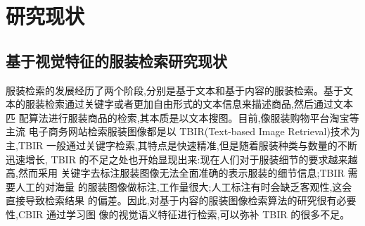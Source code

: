 \chapter{研究现状}



\section{基于视觉特征的服装检索研究现状}

服装检索的发展经历了两个阶段,分别是基于文本和基于内容的服装检索。基于文
本的服装检索通过关键字或者更加自由形式的文本信息来描述商品,然后通过文本匹
配算法进行服装商品的检索,其本质是以文本搜图。目前,像服装购物平台淘宝等主流
电子商务网站检索服装图像都是以 TBIR(Text-based Image Retrieval)技术为主,TBIR
一般通过关键字检索,其特点是快速精准,但是随着服装种类与数量的不断迅速增长,
TBIR 的不足之处也开始显现出来:现在人们对于服装细节的要求越来越高,然而采用
关键字去标注服装图像无法全面准确的表示服装的细节信息;TBIR 需要人工的对海量
的服装图像做标注,工作量很大;人工标注有时会缺乏客观性,这会直接导致检索结果
的偏差。因此,对基于内容的服装图像检索算法的研究很有必要性,CBIR 通过学习图
像的视觉语义特征进行检索,可以弥补 TBIR 的很多不足。

